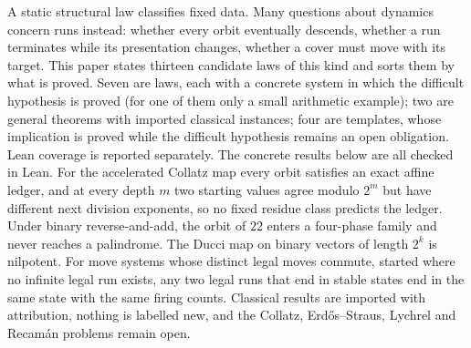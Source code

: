 A static structural law classifies fixed data. Many questions about dynamics concern runs
instead: whether every orbit eventually descends, whether a run terminates while its
presentation changes, whether a cover must move with its target. This paper states thirteen
candidate laws of this kind and sorts them by what is proved. Seven are laws, each with a concrete
system in which the difficult hypothesis is proved (for one of them only a small arithmetic
example); two are general theorems with imported classical instances; four are templates, whose
implication is proved while the difficult hypothesis remains an open obligation. Lean coverage is reported separately. The concrete results below are
all checked in Lean. For the accelerated Collatz map every orbit satisfies an exact affine ledger, and at every depth $m$ two starting values agree modulo $2^m$ but
have different next division exponents, so no fixed residue class predicts the ledger. Under binary
reverse-and-add, the orbit of $22$ enters a four-phase family and never reaches a palindrome. The
Ducci map on binary vectors of length $2^k$ is nilpotent. For move systems whose distinct legal
moves commute, started where no infinite legal run exists, any two legal runs that end in stable
states end in the same state with the same firing counts. Classical results are imported with
attribution, nothing is labelled new, and the Collatz, Erd\H{o}s--Straus, Lychrel and Recam\'an
problems remain open.

